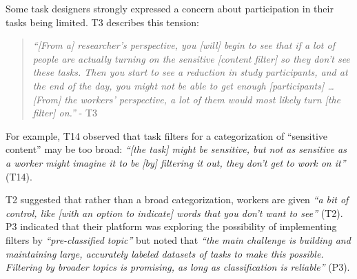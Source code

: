 Some task designers strongly expressed a concern about participation in their tasks being limited. T3 describes this tension:
\begin{quote}
    \textit{``[From a] researcher's perspective, you [will] begin to see that if a lot of people are actually turning on the sensitive [content filter] so they don't see these tasks. Then you start to see a reduction in study participants, and at the end of the day, you might not be able to get enough [participants] \dots [From] the workers' perspective,  a lot of them would most likely turn [the filter] on.''} - T3
\end{quote} 
 For example, T14 observed that task filters for a categorization of ``sensitive content'' may be too broad: \textit{``[the task] might be sensitive, but not as sensitive as a worker might imagine it to be [by] filtering it out, they don't get to work on it''} (T14). 

 T2 suggested that rather than a broad categorization, workers are given \textit{``a bit of control, like [with an option to indicate] words that you don't want to see''} (T2). P3 indicated that their platform was exploring the possibility of implementing filters by \textit{``pre-classified topic''} but noted that \textit{``the main challenge is building and maintaining large, accurately labeled datasets of tasks to make this possible. Filtering by broader topics is promising, as long as classification is reliable''} (P3). 


